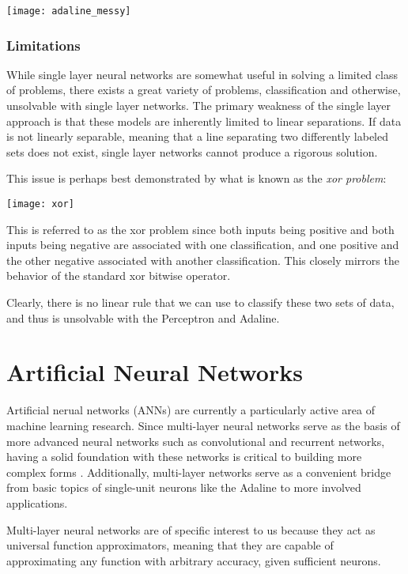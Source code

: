 \documentclass[a4paper, 11pt]{article} %
\begin{document}
\texttt{[image: adaline\_messy]}

\subsubsection*{Limitations}

While single layer neural networks are somewhat useful in solving a limited class of problems, there exists a great variety of problems, classification and otherwise, unsolvable with single layer networks.  The primary weakness of the single layer approach is that these models are inherently limited to linear separations.  If data is not linearly separable, meaning that a line separating two differently labeled sets does not exist, single layer networks cannot produce a rigorous solution.

This issue is perhaps best demonstrated by what is known as the \textit{xor problem}:

\texttt{[image: xor]}

This is referred to as the xor problem since both inputs being positive and both inputs being negative are associated with one classification, and one positive and the other negative associated with another classification.  This closely mirrors the behavior of the standard xor bitwise operator.

Clearly, there is no linear rule that we can use to classify these two sets of data, and thus is unsolvable with the Perceptron and Adaline.

\section*{Artificial Neural Networks}

Artificial nerual networks (ANNs) are currently a particularly active area of machine learning research.  Since multi-layer neural networks serve as the basis of more advanced neural networks such as convolutional and recurrent networks, having a solid foundation with these networks is critical to building more complex forms \cite{wu}.  Additionally, multi-layer networks serve as a convenient bridge from basic topics of single-unit neurons like the Adaline to more involved applications.

Multi-layer neural networks are of specific interest to us because they act as universal function approximators, meaning that they are capable of approximating any function with arbitrary accuracy, given sufficient neurons.
\end{document}
